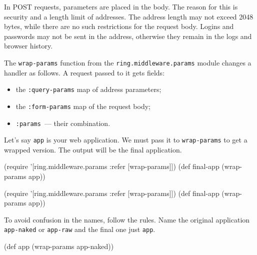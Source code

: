 In POST requests, parameters are placed in the body. The reason for this is security and a length limit of addresses. The address length may not exceed 2048 bytes, while there are no such restrictions for the request body. Logins and passwords may not be sent in the address, otherwise they remain in the logs and browser history.


The \verb|wrap-params| function from the \verb|ring.middleware.params| module changes a handler as follows. A request passed to it gets fields:

\begin{itemize}

\item
the \verb|:query-params| map of address parameters;

\item
the \verb|:form-params| map of the request body;

\item
\verb|:params|~--- their combination.

\end{itemize}

Let's say \verb|app| is your web application. We must pass it to \verb|wrap-params| to get a wrapped version. The output will be the final application.


\ifx\DEVICETYPE\MOBILE

\begin{english}
  \begin{clojure}
(require '[ring.middleware.params
           :refer [wrap-params]])
(def final-app (wrap-params app))
  \end{clojure}
\end{english}

\else

\begin{english}
  \begin{clojure}
(require '[ring.middleware.params :refer [wrap-params]])
(def final-app (wrap-params app))
  \end{clojure}
\end{english}

\fi

To avoid confusion in the names, follow the rules. Name the original application \verb|app-naked| or \verb|app-raw| and the final one just \verb|app|.

\begin{english}
  \begin{clojure}
(def app (wrap-params app-naked))
  \end{clojure}
\end{english}


